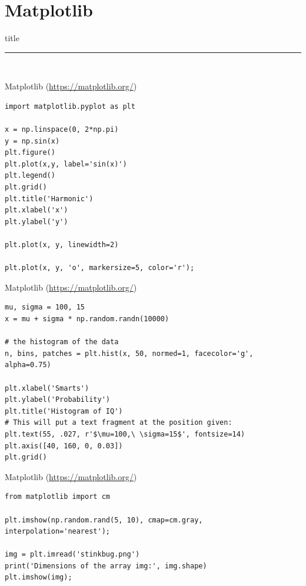\documentclass{beamer}
\begin{document}
\section{Matplotlib }
\begin{frame}[plain]
  \vfill
  \centering
  \begin{beamercolorbox}[sep=8pt,center,shadow=true,rounded=true]{title}
    \par%
    \color{oxfordblue}\noindent\rule{10cm}{1pt} \\
  \end{beamercolorbox}
  \vfill
\end{frame}

\begin{frame}[fragile]{Matplotlib (\url{https://matplotlib.org/})}
\begin{lstlisting}
import matplotlib.pyplot as plt

x = np.linspace(0, 2*np.pi)
y = np.sin(x)
plt.figure()
plt.plot(x,y, label='sin(x)')
plt.legend()
plt.grid()
plt.title('Harmonic')
plt.xlabel('x')
plt.ylabel('y')

plt.plot(x, y, linewidth=2)

plt.plot(x, y, 'o', markersize=5, color='r');
\end{lstlisting}
\end{frame}

\begin{frame}[fragile]{Matplotlib (\url{https://matplotlib.org/})}
\begin{lstlisting}
mu, sigma = 100, 15
x = mu + sigma * np.random.randn(10000)

# the histogram of the data
n, bins, patches = plt.hist(x, 50, normed=1, facecolor='g', alpha=0.75)

plt.xlabel('Smarts')
plt.ylabel('Probability')
plt.title('Histogram of IQ')
# This will put a text fragment at the position given:
plt.text(55, .027, r'$\mu=100,\ \sigma=15$', fontsize=14)
plt.axis([40, 160, 0, 0.03])
plt.grid()
\end{lstlisting}
\end{frame}

\begin{frame}[fragile]{Matplotlib (\url{https://matplotlib.org/})}
\begin{lstlisting}
from matplotlib import cm

plt.imshow(np.random.rand(5, 10), cmap=cm.gray, interpolation='nearest');

img = plt.imread('stinkbug.png')
print('Dimensions of the array img:', img.shape)
plt.imshow(img);
\end{lstlisting}
\end{frame}
\end{document}
